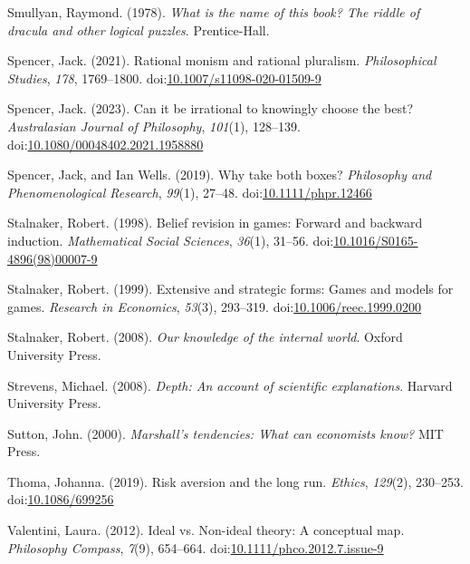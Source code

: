 \documentclass[
  12pt,
  letterpaper,
  DIV=11,
  numbers=noendperiod]{scrreprt}
\newlength{\cslhangindent}
\newenvironment{CSLReferences}[2] %
 {\begin{list}{}{%
  \setlength{\itemindent}{0pt}
  \setlength{\leftmargin}{0pt}
  \setlength{\parsep}{0pt}
  \ifodd #1
   \setlength{\leftmargin}{\cslhangindent}
   \setlength{\itemindent}{-1\cslhangindent}
  \fi
  \setlength{\itemsep}{#2\baselineskip}}}
 {\end{list}}
\begin{document}
\begin{CSLReferences}{1}{0}
Smullyan, Raymond. (1978). \emph{What is the name of this book? The
riddle of dracula and other logical puzzles}. Prentice-Hall.

Spencer, Jack. (2021). Rational monism and rational pluralism.
\emph{Philosophical Studies}, \emph{178}, 1769--1800.
doi:\href{https://doi.org/10.1007/s11098-020-01509-9}{10.1007/s11098-020-01509-9}

Spencer, Jack. (2023). Can it be irrational to knowingly choose the
best? \emph{Australasian Journal of Philosophy}, \emph{101}(1),
128--139.
doi:\href{https://doi.org/10.1080/00048402.2021.1958880}{10.1080/00048402.2021.1958880}

Spencer, Jack, and Ian Wells. (2019). Why take both boxes?
\emph{{P}hilosophy and {P}henomenological {R}esearch}, \emph{99}(1),
27--48.
doi:\href{https://doi.org/10.1111/phpr.12466}{10.1111/phpr.12466}

Stalnaker, Robert. (1998). Belief revision in games: Forward and
backward induction. \emph{Mathematical Social Sciences}, \emph{36}(1),
31--56.
doi:\href{https://doi.org/10.1016/S0165-4896(98)00007-9}{10.1016/S0165-4896(98)00007-9}

Stalnaker, Robert. (1999). Extensive and strategic forms: Games and
models for games. \emph{Research in Economics}, \emph{53}(3), 293--319.
doi:\href{https://doi.org/10.1006/reec.1999.0200}{10.1006/reec.1999.0200}

Stalnaker, Robert. (2008). \emph{Our knowledge of the internal world}.
Oxford University Press.

Strevens, Michael. (2008). \emph{Depth: An account of scientific
explanations}. Harvard University Press.

Sutton, John. (2000). \emph{Marshall's tendencies: What can economists
know?} {MIT} Press.

Thoma, Johanna. (2019). Risk aversion and the long run. \emph{Ethics},
\emph{129}(2), 230--253.
doi:\href{https://doi.org/10.1086/699256}{10.1086/699256}

Valentini, Laura. (2012). Ideal vs. Non-ideal theory: A conceptual map.
\emph{Philosophy Compass}, \emph{7}(9), 654--664.
doi:\href{https://doi.org/10.1111/phco.2012.7.issue-9}{10.1111/phco.2012.7.issue-9}


\end{CSLReferences}
\end{document}

